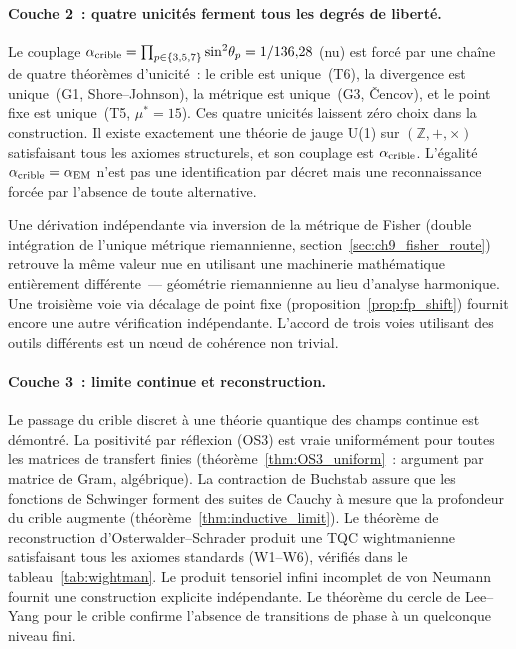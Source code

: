 \documentclass[12pt,a4paper]{article}
\begin{document}
\paragraph{Couche 2~: quatre unicités ferment tous les degrés de liberté.}
Le couplage $\alpha_{\rm crible} = \prod_{p \in \{3,5,7\}}
\sin^2\!\theta_p = 1/136{,}28$ (nu) est forcé par une chaîne de
quatre théorèmes d'unicité~: le crible est unique~(T6), la
divergence est unique~(G1, Shore--Johnson), la métrique est unique~(G3,
\v{C}encov), et le point fixe est unique~(T5, $\mu^* = 15$). Ces
quatre unicités laissent zéro choix dans la construction. Il existe
exactement une théorie de jauge U(1) sur $(\mathbb{Z}, +, \times)$
satisfaisant tous les axiomes structurels, et son couplage est
$\alpha_{\rm crible}$. L'égalité
$\alpha_{\rm crible} = \alpha_{\rm EM}$ n'est pas une identification
par décret mais une reconnaissance forcée par l'absence de toute
alternative.

Une dérivation indépendante via inversion de la métrique de Fisher
(double intégration de l'unique métrique riemannienne,
section~\ref{sec:ch9_fisher_route}) retrouve la même valeur nue en
utilisant une machinerie mathématique entièrement différente~---
géométrie riemannienne au lieu d'analyse harmonique. Une troisième
voie via décalage de point fixe (proposition~\ref{prop:fp_shift})
fournit encore une autre vérification indépendante. L'accord de
trois voies utilisant des outils différents est un n{\oe}ud de
cohérence non trivial.

\paragraph{Couche 3~: limite continue et reconstruction.}
Le passage du crible discret à une théorie quantique des champs
continue est démontré. La positivité par réflexion (OS3) est vraie
uniformément pour toutes les matrices de transfert finies
(théorème~\ref{thm:OS3_uniform}~: argument par matrice de Gram,
algébrique). La contraction de Buchstab assure que les fonctions
de Schwinger forment des suites de Cauchy à mesure que la
profondeur du crible augmente
(théorème~\ref{thm:inductive_limit}). Le théorème de reconstruction
d'Osterwalder--Schrader produit une TQC wightmanienne satisfaisant
tous les axiomes standards (W1--W6), vérifiés dans le
tableau~\ref{tab:wightman}. Le produit tensoriel infini incomplet
de von Neumann fournit une construction explicite indépendante. Le
théorème du cercle de Lee--Yang pour le crible confirme l'absence
de transitions de phase à un quelconque niveau fini.
\end{document}
